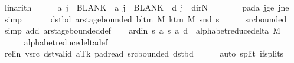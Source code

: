 \begin{isabellebody}
\ linarith\isanewline
\ \ \ \ \isamarkupfalse%
\ {\isachardoublequoteopen}{\isacharquery}{\kern0pt}a\ j\ {\isacharequal}{\kern0pt}\ BLANK{}\ {\isasymand}\ {\isacharquery}{\kern0pt}a\ j\ {\isacharequal}{\kern0pt}\ BLANK{}\ {\isasymand}\ {\isacharquery}{\kern0pt}d\ j\ {\isacharequal}{\kern0pt}\ dir{\isachardot}{\kern0pt}N{\isachardoublequoteclose}\isanewline
\ \ \ \ \ \ \isamarkupfalse%
\ pad{\isacharunderscore}{\kern0pt}a\ jge\ jne\ \isamarkupfalse%
\ simp\isanewline
\ \ \isamarkupfalse%
\isanewline
\ \ \isamarkupfalse%
\ dst{\isacharunderscore}{\kern0pt}bd{\isacharcolon}{\kern0pt}\ {\isachardoublequoteopen}ar{\isacharunderscore}{\kern0pt}stage{\isacharunderscore}{\kern0pt}bounded\ {\isacharparenleft}{\kern0pt}bl{\isacharunderscore}{\kern0pt}tm\ M{\isacharparenright}{\kern0pt}\ {\isacharparenleft}{\kern0pt}k{\isacharunderscore}{\kern0pt}tm\ M{\isacharparenright}{\kern0pt}\ {\isacharparenleft}{\kern0pt}snd\ {\isacharquery}{\kern0pt}s{\isacharprime}{\kern0pt}{\isacharparenright}{\kern0pt}{\isachardoublequoteclose}\isanewline
\ \ \ \ \isamarkupfalse%
\ src{\isacharunderscore}{\kern0pt}bounded\ \isamarkupfalse%
\ {\isacharparenleft}{\kern0pt}simp\ add{\isacharcolon}{\kern0pt}\ ar{\isacharunderscore}{\kern0pt}stage{\isacharunderscore}{\kern0pt}bounded{\isacharunderscore}{\kern0pt}def{\isacharparenright}{\kern0pt}\isanewline
\ \ \isamarkupfalse%
\ ard{\isacharunderscore}{\kern0pt}in{\isacharcolon}{\kern0pt}\ {\isachardoublequoteopen}{\isacharparenleft}{\kern0pt}{\isacharquery}{\kern0pt}s{\isacharcomma}{\kern0pt}\ {\isacharquery}{\kern0pt}a{\isacharcomma}{\kern0pt}\ {\isacharquery}{\kern0pt}s{\isacharprime}{\kern0pt}{\isacharcomma}{\kern0pt}\ {\isacharquery}{\kern0pt}a{\isacharcomma}{\kern0pt}\ {\isacharquery}{\kern0pt}d{\isacharparenright}{\kern0pt}\ {\isasymin}\ alphabet{\isacharunderscore}{\kern0pt}reduce{\isacharunderscore}{\kern0pt}delta\ M{\isachardoublequoteclose}\isanewline
\ \ \ \ \isamarkupfalse%
\ alphabet{\isacharunderscore}{\kern0pt}reduce{\isacharunderscore}{\kern0pt}delta{\isacharunderscore}{\kern0pt}def\isanewline
\ \ \ \ \isamarkupfalse%
\ rel{\isacharunderscore}{\kern0pt}in\ vsrc\ dst{\isacharunderscore}{\kern0pt}valid\ aTk\ pad{\isacharunderscore}{\kern0pt}read\ src{\isacharunderscore}{\kern0pt}bounded\ dst{\isacharunderscore}{\kern0pt}bd\isanewline
\ \ \ \ \isamarkupfalse%
\ {\isacharparenleft}{\kern0pt}auto\ split{\isacharcolon}{\kern0pt}\ if{\isacharunderscore}{\kern0pt}splits{\isacharparenright}{\kern0pt}\isanewline

\end{isabellebody}
